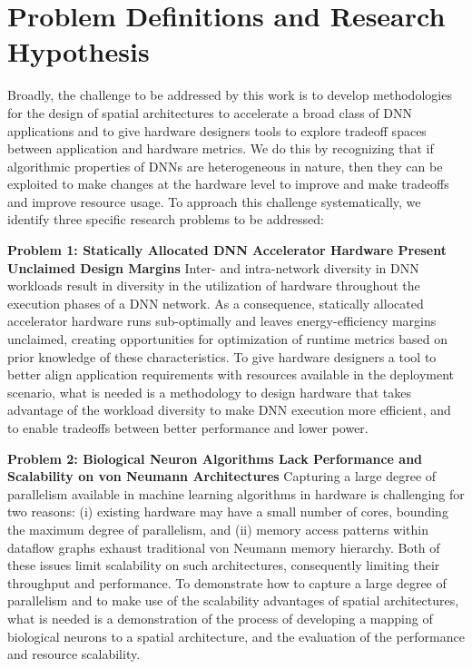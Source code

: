 \section{Problem Definitions and Research Hypothesis}

Broadly, the challenge to be addressed by this work is to develop methodologies for the design of spatial architectures to accelerate a broad class of DNN applications and to give hardware designers tools to explore tradeoff spaces between application and hardware metrics. 
We do this by recognizing that if algorithmic properties of DNNs are heterogeneous in nature, then they can be exploited to make changes at the hardware level to improve and make tradeoffs and improve resource usage.
To approach this challenge systematically, we identify three specific research problems to be addressed:

\textbf{Problem 1: Statically Allocated DNN Accelerator Hardware Present Unclaimed Design Margins} Inter- and intra-network diversity in DNN workloads result in diversity in the utilization of hardware throughout the execution phases of a DNN network.
As a consequence, statically allocated accelerator hardware runs sub-optimally and leaves energy-efficiency margins unclaimed, creating opportunities for optimization of runtime metrics based on prior knowledge of these characteristics.
To give hardware designers a tool to better align application requirements with resources available in the deployment scenario, what is needed is a methodology to design hardware that takes advantage of the workload diversity to make DNN execution more efficient, and to enable tradeoffs between better performance and lower power.

\textbf{Problem 2: Biological Neuron Algorithms Lack Performance and Scalability on von Neumann Architectures} Capturing a large degree of parallelism available in machine learning algorithms in hardware is challenging for two reasons: (i) existing hardware may have a small number of cores, bounding the maximum degree of parallelism, and (ii) memory access patterns within dataflow graphs exhaust traditional von Neumann memory hierarchy.
Both of these issues limit scalability on such architectures, consequently limiting their throughput and performance.
To demonstrate how to capture a large degree of parallelism and to make use of the scalability advantages of spatial architectures, what is needed is a demonstration of the process of developing a mapping of biological neurons to a spatial architecture, and the evaluation of the performance and resource scalability.

